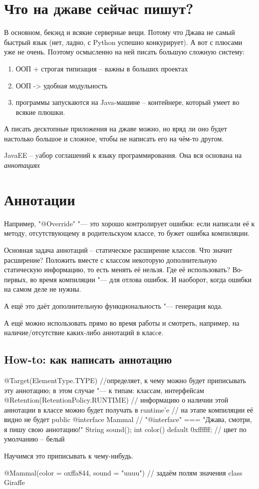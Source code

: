 \section{Что на джаве сейчас пишут?}

В основном, бекэнд и всякие серверные вещи. Потому что Джава не самый быстрый язык (нет, ладно, с Python успешно конкурирует).
А вот с плюсами уже не очень.
Поэтому осмысленно на ней писать большую сложную систему: 
\begin{enumerate}
\item
ООП + строгая типизация -- важны в больших проектах
\item
ООП -> удобная модульность
\item
программы запускаются на Java-машине -- контейнере, который умеет во всякие плюшки.
\end{enumerate}

А писать десктопные приложения на джаве можно, но вряд ли оно будет настолько большое и сложное, чтобы не написать его на чём-то другом.

JavaEE -- yабор соглашений к языку программирования. Она вся основана на \textit{аннотациях}

\section{Аннотации}
Например, \java"@Override" "--- это хорошо контролирует ошибки: если написали её к методу, отсутствующему в родительскуом классе, 
то бужет ошибка компиляции.

Основная задача аннотаций -- статическое расширение классов. 
Что значит расширение? Положить вместе с классом некоторую дополнительную статическую информацию, то есть менять её нельзя.
Где её использовать? Во-первых, во время компиляции "--- 
для отлова ошибок. 
И наоборот, когда ошибки на самом деле не нужны.

А ещё это даёт дополнительную функциональность "--- генерация кода.

А ещё можно использовать прямо во время работы и смотреть, например, на наличие/отсутствие каких-либо аннотаций в класcе.

\subsection{How-to: как написать аннотацию}
\begin{javacode}
@Target(ElementType.TYPE) //определяет, к чему можно будет приписывать эту аннотацию; в этом случае "--- к типам: классам, интерфейсам
@Retention(RetentionPolicy.RUNTIME) // информацию о наличии этой аннотации в классе можно будет получать в runtime'e
				    // на этапе компиляции её видно не будет
public @interface Mammal { // "@interface" === "Джава, смотри, я пишу свою аннотацию!"
	String sound();
	int color() default 0xffffff; // цвет по умолчанию -- белый
}
\end{javacode}
Научимся это приписывать к чему-нибудь.
\begin{javacode}
@Mammal(color = oxffa844, sound = "uuuu") // задаём полям значения
class Giraffe {
}
\end{javacode}

